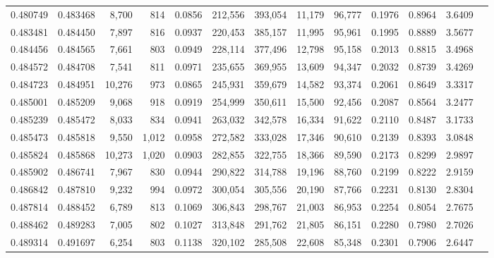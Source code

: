 \begin{tabular}{rrrrrrrrrrrrr}
0.480749 & 0.483468 &  8,700 &   814 &                                     0.0856 & 212,556 & 393,054 &  11,179 &  96,777 & 0.1976 & 0.8964 & 3.6409 \\
0.483481 & 0.484450 &  7,897 &   816 &                                     0.0937 & 220,453 & 385,157 &  11,995 &  95,961 & 0.1995 & 0.8889 & 3.5677 \\
0.484456 & 0.484565 &  7,661 &   803 &                                     0.0949 & 228,114 & 377,496 &  12,798 &  95,158 & 0.2013 & 0.8815 & 3.4968 \\
0.484572 & 0.484708 &  7,541 &   811 &                                     0.0971 & 235,655 & 369,955 &  13,609 &  94,347 & 0.2032 & 0.8739 & 3.4269 \\
0.484723 & 0.484951 & 10,276 &   973 &                                     0.0865 & 245,931 & 359,679 &  14,582 &  93,374 & 0.2061 & 0.8649 & 3.3317 \\
0.485001 & 0.485209 &  9,068 &   918 &                                     0.0919 & 254,999 & 350,611 &  15,500 &  92,456 & 0.2087 & 0.8564 & 3.2477 \\
0.485239 & 0.485472 &  8,033 &   834 &                                     0.0941 & 263,032 & 342,578 &  16,334 &  91,622 & 0.2110 & 0.8487 & 3.1733 \\
0.485473 & 0.485818 &  9,550 & 1,012 &                                     0.0958 & 272,582 & 333,028 &  17,346 &  90,610 & 0.2139 & 0.8393 & 3.0848 \\
0.485824 & 0.485868 & 10,273 & 1,020 &                                     0.0903 & 282,855 & 322,755 &  18,366 &  89,590 & 0.2173 & 0.8299 & 2.9897 \\
0.485902 & 0.486741 &  7,967 &   830 &                                     0.0944 & 290,822 & 314,788 &  19,196 &  88,760 & 0.2199 & 0.8222 & 2.9159 \\
0.486842 & 0.487810 &  9,232 &   994 &                                     0.0972 & 300,054 & 305,556 &  20,190 &  87,766 & 0.2231 & 0.8130 & 2.8304 \\
0.487814 & 0.488452 &  6,789 &   813 &                                     0.1069 & 306,843 & 298,767 &  21,003 &  86,953 & 0.2254 & 0.8054 & 2.7675 \\
0.488462 & 0.489283 &  7,005 &   802 &                                     0.1027 & 313,848 & 291,762 &  21,805 &  86,151 & 0.2280 & 0.7980 & 2.7026 \\
0.489314 & 0.491697 &  6,254 &   803 &                                     0.1138 & 320,102 & 285,508 &  22,608 &  85,348 & 0.2301 & 0.7906 & 2.6447 \\

\end{tabular}
